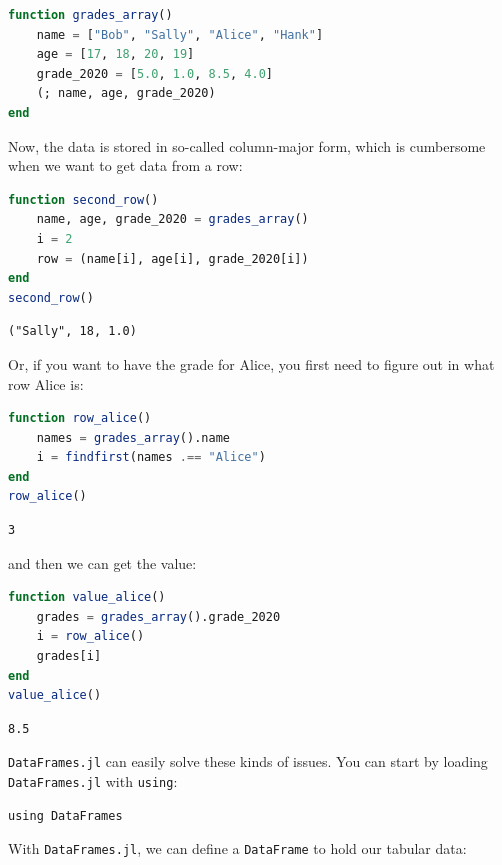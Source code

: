 \documentclass[
  notoc %
]{tufte-book}
\newcommand{\passthrough}[1]{#1}
\begin{document}
\begin{lstlisting}[language=Julia]
function grades_array()
    name = ["Bob", "Sally", "Alice", "Hank"]
    age = [17, 18, 20, 19]
    grade_2020 = [5.0, 1.0, 8.5, 4.0]
    (; name, age, grade_2020)
end
\end{lstlisting}

Now, the data is stored in so-called column-major form, which is
cumbersome when we want to get data from a row:

\begin{lstlisting}[language=Julia]
function second_row()
    name, age, grade_2020 = grades_array()
    i = 2
    row = (name[i], age[i], grade_2020[i])
end
second_row()
\end{lstlisting}

\begin{lstlisting}[language=Output]
("Sally", 18, 1.0)
\end{lstlisting}

Or, if you want to have the grade for Alice, you first need to figure
out in what row Alice is:

\begin{lstlisting}[language=Julia]
function row_alice()
    names = grades_array().name
    i = findfirst(names .== "Alice")
end
row_alice()
\end{lstlisting}

\begin{lstlisting}[language=Output]
3
\end{lstlisting}

and then we can get the value:

\begin{lstlisting}[language=Julia]
function value_alice()
    grades = grades_array().grade_2020
    i = row_alice()
    grades[i]
end
value_alice()
\end{lstlisting}

\begin{lstlisting}[language=Output]
8.5
\end{lstlisting}

\passthrough{\lstinline!DataFrames.jl!} can easily solve these kinds of
issues. You can start by loading \passthrough{\lstinline!DataFrames.jl!}
with \passthrough{\lstinline!using!}:

\begin{lstlisting}
using DataFrames
\end{lstlisting}

With \passthrough{\lstinline!DataFrames.jl!}, we can define a
\passthrough{\lstinline!DataFrame!} to hold our tabular data:
\end{document}
